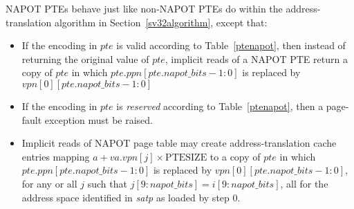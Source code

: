 NAPOT PTEs behave just like non-NAPOT PTEs do within the address-translation
algorithm in Section~\ref{sv32algorithm}, except that:
\begin{itemize}
  \item If the encoding in $pte$ is valid according to Table~\ref{ptenapot},
    then instead of returning the original value of $pte$, implicit reads of a
    NAPOT PTE return a copy of $pte$ in which $pte.ppn[pte.napot\_bits-1:0]$ is
    replaced by $vpn[0][pte.napot\_bits-1:0]$
  \item If the encoding in $pte$ is {\em reserved} according to
    Table~\ref{ptenapot}, then a page-fault exception must be raised.
  \item Implicit reads of NAPOT page table may create address-translation cache
    entries mapping $a + va.vpn[j] \times \textrm{PTESIZE}$ to a copy of $pte$
    in which $pte.ppn[pte.napot\_bits-1:0]$ is replaced by
    $vpn[0][pte.napot\_bits-1:0]$, for any or all $j$ such that
    $j[9:napot\_bits]=i[9:napot\_bits]$, all for the address space identified
    in {\em satp} as loaded by step 0.
\end{itemize}

